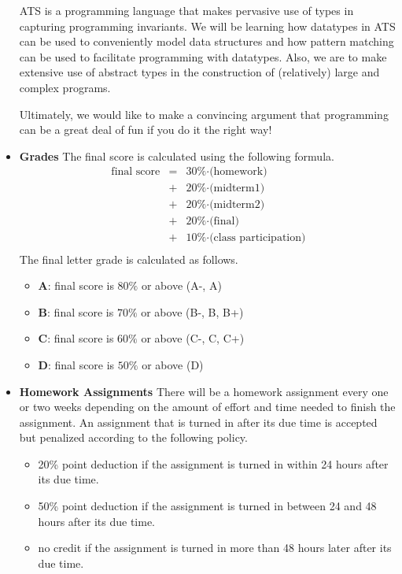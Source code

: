 \documentclass[11pt]{article}
\begin{document}
\begin{itemize}
ATS is a programming language that makes pervasive use of types in
capturing programming invariants. We will be learning how datatypes in ATS
can be used to conveniently model data structures and how pattern matching
can be used to facilitate programming with datatypes. Also, we are to make
extensive use of abstract types in the construction of (relatively) large
and complex programs.

Ultimately, we would like to make a convincing argument that programming
can be a great deal of fun if you do it the right way!

\item {\bf Grades}
The final score is calculated using the following formula.
\[\begin{array}{rcl}
\mbox{final score} & = & \mbox{30\%$\cdot$(homework)} \\
                   & + & \mbox{20\%$\cdot$(midterm1)} \\
                   & + & \mbox{20\%$\cdot$(midterm2)} \\
                   & + & \mbox{20\%$\cdot$(final)} \\
                   & + & \mbox{10\%$\cdot$(class participation)} \\
\end{array}\]
The final letter grade is calculated as follows.
\begin{itemize}
\item{\bf A}: final score is $80\%$ or above (A-, A)
\item{\bf B}: final score is $70\%$ or above (B-, B, B+)
\item{\bf C}: final score is $60\%$ or above (C-, C, C+)
\item{\bf D}: final score is $50\%$ or above (D)
\end{itemize}

\item{\bf Homework Assignments}
There will be a homework assignment every one or two weeks depending on the
amount of effort and time needed to finish the assignment. An assignment that
is turned in after its due time is accepted but penalized according to the
following policy.
\begin{itemize}
\item 20\% point deduction if the assignment is turned in within 24 hours
after its due time.
\item 50\% point deduction if the assignment is turned in between 24 and 48 hours
after its due time.
\item no credit if the assignment is turned in more than 48 hours later after its due time.
\end{itemize}


\end{itemize}
\end{document}
